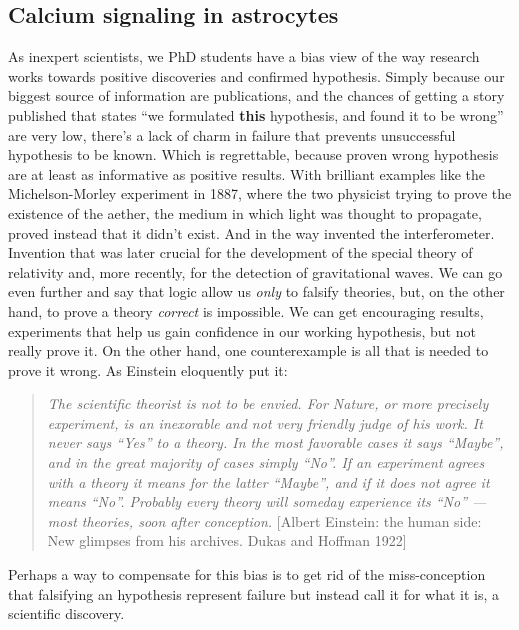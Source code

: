 \subsection{Calcium signaling in astrocytes}
\label{chap1:sec:2:subsec2:astro_calcium_signals}
As inexpert scientists, we PhD students have a bias view of the way research works towards positive discoveries and confirmed hypothesis. 
Simply because our biggest source of information are publications, and the chances of getting a story published that states \enquote{we formulated \textbf{this} hypothesis, and found it to be wrong} are very low, there's a lack of charm in failure that prevents unsuccessful hypothesis to be known. 
Which is regrettable, because proven wrong hypothesis are at least as informative as positive results.
With brilliant examples like the Michelson-Morley experiment in 1887, where the two physicist trying to prove the existence of the aether, the medium in which light was thought to propagate, proved instead that it didn't exist.  
And in the way invented the interferometer. 
Invention that was later crucial for the development of the special theory of relativity and, more recently, for the detection of gravitational waves.
We can go even further and say that logic allow us \textit{only} to falsify theories, but, on the other hand, to prove a theory \textit{correct} is impossible. 
We can get encouraging results, experiments that help us gain confidence in our working hypothesis, but not really prove it.
On the other hand, one counterexample is all that is needed to prove it wrong.
As Einstein eloquently put it: 

\begin{quote}
\textit{The scientific theorist is not to be envied. For Nature, or more precisely experiment, is an inexorable and not very friendly judge of his work. It never says \enquote{Yes} to a theory. In the most favorable cases it says \enquote{Maybe}, and in the great majority of cases simply \enquote{No}. If an experiment agrees with a theory it means for the latter \enquote{Maybe}, and if it does not agree it means \enquote{No}. Probably every theory will someday experience its \enquote{No} —most theories, soon after conception.}
[Albert Einstein: the human side: New glimpses from his archives. Dukas and Hoffman 1922]
\end{quote}
Perhaps a way to compensate for this bias is to get rid of the miss-conception that falsifying an hypothesis represent failure but instead call it for what it is, a scientific discovery.  

